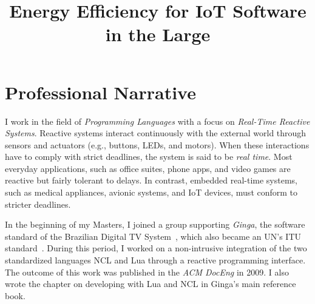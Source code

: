 \documentclass[12pt,english]{amsart}
\title{Energy Efficiency for IoT Software in the Large
        }%
\begin{document}
\date{}
\maketitle

\vspace{-1cm}
\begin{comment}
\abstract{
TODO
}
\end{comment}

\section{Professional Narrative}

I work in the field of \emph{Programming Languages} with a focus on
\emph{Real-Time Reactive Systems}.
Reactive systems interact continuously with the external world through sensors
and actuators (e.g., buttons, LEDs, and motors).
When these interactions have to comply with strict deadlines, the system is
said to be \emph{real time}.
Most everyday applications, such as office suites, phone apps, and video games
are reactive but fairly tolerant to delays.
In contrast, embedded real-time systems, such as medical appliances,
avionic systems, and IoT devices, must conform to stricter deadlines.

In the beginning of my Masters, I joined a group supporting
\emph{Ginga}, the software standard of the Brazilian Digital TV
System~\cite{ncl.abnt}, which also became an UN's ITU
standard~\cite{ncl.itu}.
During this period, I worked on a non-intrusive integration of the two
standardized languages NCL and Lua through a reactive programming
interface.
The outcome of this work was published in the \emph{ACM DocEng} in 2009.
I also wrote the chapter on developing with Lua and NCL in Ginga's main
reference book. %

\begin{comment}
NCL is a declarative language to specify how multiple media objects are
composed together in cause-effect relationships to form a complete multimedia
presentation (e.g., after 1 minute of a video playback, show an image for 10
seconds).
Lua is a scripting language that extends the power of NCL with generic
programming language constructs such as loops, variables, and arithmetic
expressions.
During the same period, I wrote my Masters thesis on the design of
\emph{LuaGravity}, a programming language that extends Lua with support to
handle events from the environment.
Programs written in LuaGravity behave like spreadsheets, in which a user
event (e.g., typing a new number in a cell) propagates throughout the program
and changes all of its dependencies automatically.
\end{comment}
\end{document}
